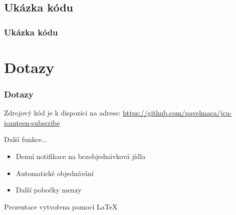 \documentclass[slidestop]{beamer}
\begin{document}
\subsection{Ukázka kódu}
\begin{frame}[containsverbatim]
\frametitle{Ukázka kódu}
\begin{figure}[h] %
\begin{center}
\end{center}
\end{figure}
\end{frame}
\section{Dotazy}
\begin{frame}
\frametitle{Dotazy}
\vfill
Zdrojový kód je k dispozici na adrese:
\href{https://github.com/pavelmaca/jcu-icanteen-subscribe}{https://github.com/pavelmaca/jcu-icanteen-subscribe} 

\begin{block}{Další funkce...}
  \begin{itemize}
  \item Denní notifikace na bezobjednávková jídla
  \item Automatické objednávání
  \item Další pobočky menzy
  \end{itemize}
\end{block}
\vfill
\tiny {Prezentace vytvořena pomocí \LaTeX}
\end{frame}
\end{document}
